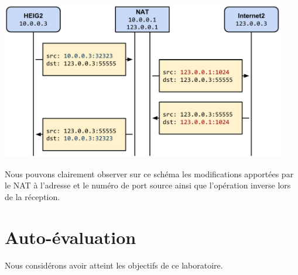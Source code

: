\documentclass[11pt,a4paper]{article}
\begin{document}
\begin{center}
\includegraphics[width=12.5cm]{img_nat}
\end{center}

Nous pouvons clairement observer sur ce schéma les modifications apportées par le NAT à l'adresse et le numéro de port source ainsi que l'opération inverse lors de la réception.

\section{Auto-évaluation}

Nous considérons avoir atteint les objectifs de ce laboratoire.
\end{document}
